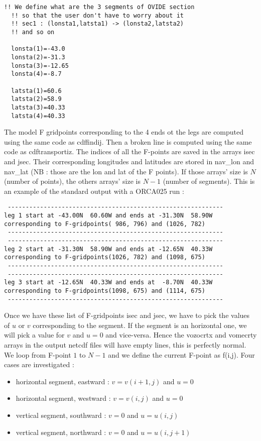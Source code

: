 \documentclass[a4paper,11pt]{article}
\begin{document}
\begin{verbatim}
!! We define what are the 3 segments of OVIDE section
  !! so that the user don't have to worry about it
  !! sec1 : (lonsta1,latsta1) -> (lonsta2,latsta2)
  !! and so on

  lonsta(1)=-43.0
  lonsta(2)=-31.3
  lonsta(3)=-12.65
  lonsta(4)=-8.7

  latsta(1)=60.6
  latsta(2)=58.9
  latsta(3)=40.33
  latsta(4)=40.33

\end{verbatim}

The model F gridpoints corresponding to the 4 ends ot the legs are computed using the same code as cdffindij. Then
a broken line is computed using the same code as cdftransportiz. The indices of all the F-points are saved in the arrays isec and jsec.
Their corresponding longitudes and latitudes are stored in nav\_lon and nav\_lat (NB : those are the lon and lat of the F points). If those
arrays' size is $N$ (number of points), the others arrays' size is $N-1$ (number of segments). This is an example of the standard output 
with a ORCA025 run :

\begin{verbatim}
 ------------------------------------------------------------
leg 1 start at -43.00N  60.60W and ends at -31.30N  58.90W
corresponding to F-gridpoints( 986, 796) and (1026, 782)
 ------------------------------------------------------------
 ------------------------------------------------------------
leg 2 start at -31.30N  58.90W and ends at -12.65N  40.33W
corresponding to F-gridpoints(1026, 782) and (1098, 675)
 ------------------------------------------------------------
 ------------------------------------------------------------
leg 3 start at -12.65N  40.33W and ends at  -8.70N  40.33W
corresponding to F-gridpoints(1098, 675) and (1114, 675)
 ------------------------------------------------------------

\end{verbatim}

\noindent
Once we have these list of F-gridpoints isec and jsec, we have to pick the values of $u$ or $v$ corresponding to the segment.
If the segment is an horizontal one, we will pick a value for $v$ and $u=0$ and vice-versa. Hence the vozocrtx and vomecrty arrays
in the output netcdf files will have empty lines, this is perfectly normal. We loop from F-point $1$ to $N-1$ and we define the current
F-point as f(i,j). Four cases are investigated :

\begin{itemize}
\item horizontal segment, eastward : $v = v(i+1,j)$ and $u = 0$
\item horizontal segment, westward : $v = v(i,j)$ and $u = 0$
\item vertical segment, southward : $v = 0$ and $u = u(i,j)$
\item vertical segment, northward : $v = 0 $ and $u = u(i,j+1)$
\end{itemize}  
\end{document}
